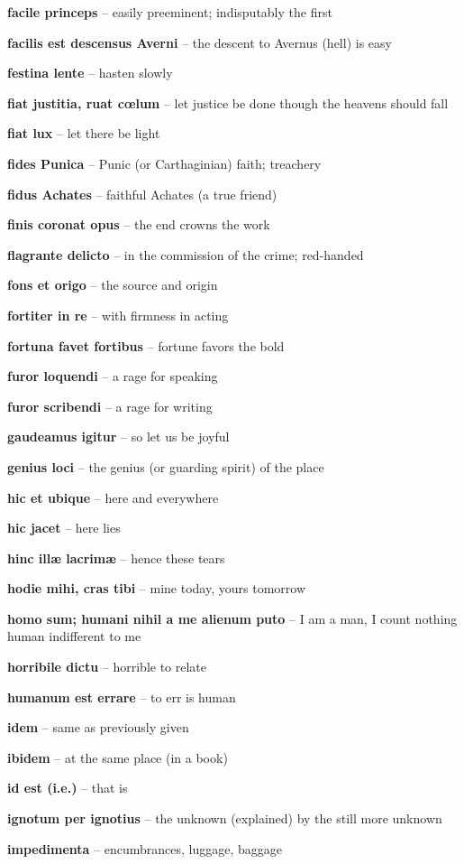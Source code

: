 \documentclass[12pt]{article}
\newcommand{\lat}[1]{\textbf{#1}}
\begin{document}
\lat{facile princeps} -- easily preeminent; indisputably the first

\lat{facilis est descensus Averni} -- the descent to Avernus (hell) is easy

\lat{festina lente} -- hasten slowly

\lat{fiat justitia, ruat c\oe{lum}} -- let justice be done though the heavens should fall

\lat{fiat lux} -- let there be light

\lat{fides Punica} -- Punic (or Carthaginian) faith; treachery

\lat{fidus Achates} -- faithful Achates (a true friend)

\lat{finis coronat opus} -- the end crowns the work

\lat{flagrante delicto} -- in the commission of the crime; red-handed

\lat{fons et origo} -- the source and origin

\lat{fortiter in re} -- with firmness in acting

\lat{fortuna favet fortibus} -- fortune favors the bold

\lat{furor loquendi} -- a rage for speaking

\lat{furor scribendi} -- a rage for writing

\lat{gaudeamus igitur} -- so let us be joyful

\lat{genius loci} -- the genius (or guarding spirit) of the place

\lat{hic et ubique} -- here and everywhere

\lat{hic jacet} -- here lies

\lat{hinc ill\ae{} lacrim\ae} -- hence these tears

\lat{hodie mihi, cras tibi} -- mine today, yours tomorrow

\lat{homo sum; humani nihil a me alienum puto} -- I am a man, I count nothing human indifferent to me

\lat{horribile dictu} -- horrible to relate

\lat{humanum est errare} -- to err is human

\lat{idem} -- same as previously given

\lat{ibidem} -- at the same place (in a book)

\lat{id est (i.e.)} -- that is

\lat{ignotum per ignotius} -- the unknown (explained) by the still more unknown

\lat{impedimenta} -- encumbrances, luggage, baggage
\end{document}
